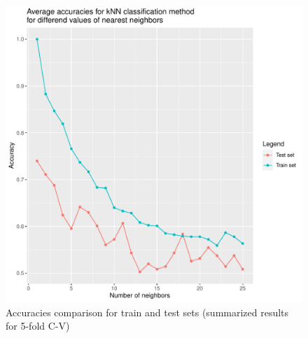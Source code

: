 \documentclass[11pt,a4paper]{article}\usepackage[]{graphicx}\usepackage[]{xcolor}
\makeatletter
\def\maxwidth{ %
  \ifdim\Gin@nat@width>\linewidth
    \linewidth
  \else
    \Gin@nat@width
  \fi
}
\newenvironment{knitrout}{}{} %
\makeatother
\begin{document}
\begin{knitrout}
\color{fgcolor}\begin{figure}
\includegraphics[width=\maxwidth]{figure/knn_results-1} \caption[Accuracies comparison for train and test sets (summarized results for 5-fold C-V)]{Accuracies comparison for train and test sets (summarized results for 5-fold C-V)}\label{fig:knn_results}
\end{figure}

\end{knitrout}
	
\end{document}
